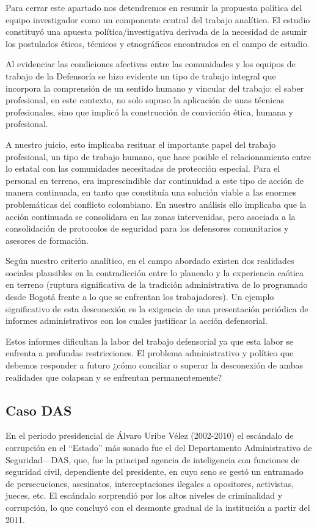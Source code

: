 \documentclass[
  spanish,
  11pt,
  a4paper,
]{scrbook}
\begin{document}
Para cerrar este apartado nos detendremos en resumir la propuesta
política del equipo investigador como un componente central del trabajo
analítico. El estudio constituyó una apuesta política/investigativa
derivada de la necesidad de asumir los postulados éticos, técnicos y
etnográficos encontrados en el campo de estudio.

Al evidenciar las condiciones afectivas entre las comunidades y los
equipos de trabajo de la Defensoría se hizo evidente un tipo de trabajo
integral que incorpora la comprensión de un sentido humano y vincular
del trabajo: el saber profesional, en este contexto, no solo supuso la
aplicación de unas técnicas profesionales, sino que implicó la
construcción de convicción ética, humana y profesional.

A nuestro juicio, esto implicaba resituar el importante papel del
trabajo profesional, un tipo de trabajo humano, que hace posible el
relacionamiento entre lo estatal con las comunidades necesitadas de
protección especial. Para el personal en terreno, era imprescindible dar
continuidad a este tipo de acción de manera continuada, en tanto que
constituía una solución viable a las enormes problemáticas del conflicto
colombiano. En nuestro análisis ello implicaba que la acción continuada
se consolidara en las zonas intervenidas, pero asociada a la
consolidación de protocolos de seguridad para los defensores
comunitarios y asesores de formación.

Según nuestro criterio analítico, en el campo abordado existen dos
realidades sociales plausibles en la contradicción entre lo planeado y
la experiencia caótica en terreno (ruptura significativa de la tradición
administrativa de lo programado desde Bogotá frente a lo que se
enfrentan los trabajadores). Un ejemplo significativo de esta
desconexión es la exigencia de una presentación periódica de informes
administrativos con los cuales justificar la acción defensorial.

Estos informes dificultan la labor del trabajo defensorial ya que esta
labor se enfrenta a profundas restricciones. El problema administrativo
y político que debemos responder a futuro ¿cómo conciliar o superar la
desconexión de ambas realidades que colapsan y se enfrentan
permanentemente?

\subsection*{Caso DAS}\label{caso-das}

En el periodo presidencial de Álvaro Uribe Vélez (2002-2010) el
escándalo de corrupción en el ``Estado'' más sonado fue el del
Departamento Administrativo de Seguridad---DAS, que, fue la principal
agencia de inteligencia con funciones de seguridad civil, dependiente
del presidente, en cuyo seno se gestó un entramado de persecuciones,
asesinatos, interceptaciones ilegales a opositores, activistas, jueces,
etc. El escándalo sorprendió por los altos niveles de criminalidad y
corrupción, lo que concluyó con el desmonte gradual de la institución a
partir del 2011.
\end{document}
